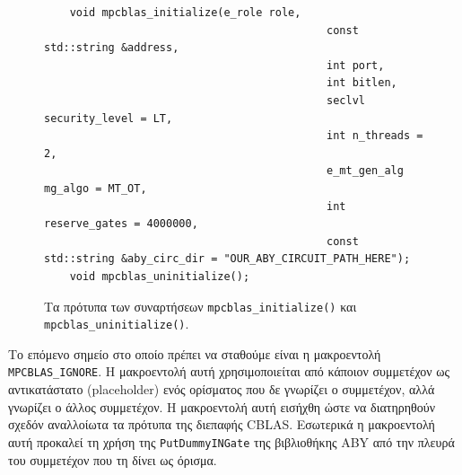 \begin{figure}[h!]
    \begin{center}
        \begin{verbatim}
    void mpcblas_initialize(e_role role,
                                            const std::string &address,
                                            int port,
                                            int bitlen,
                                            seclvl security_level = LT,
                                            int n_threads = 2,
                                            e_mt_gen_alg mg_algo = MT_OT,
                                            int reserve_gates = 4000000,
                                            const std::string &aby_circ_dir = "OUR_ABY_CIRCUIT_PATH_HERE");
    void mpcblas_uninitialize();
        \end{verbatim}
    \end{center}
    \caption{Τα πρότυπα των συναρτήσεων \texttt{mpcblas_initialize()} και \texttt{mpcblas_uninitialize()}.}
    \label{code:mpcblas-initialize-uninitialize}
\end{figure}

Το επόμενο σημείο στο οποίο πρέπει να σταθούμε είναι η μακροεντολή \texttt{MPCBLAS_IGNORE}. Η μακροεντολή αυτή χρησιμοποιείται από κάποιον συμμετέχον ως αντικατάστατο (placeholder) ενός ορίσματος που δε γνωρίζει ο συμμετέχον, αλλά γνωρίζει ο άλλος συμμετέχον. Η μακροεντολή αυτή εισήχθη ώστε να διατηρηθούν σχεδόν αναλλοίωτα τα πρότυπα της διεπαφής CBLAS. Εσωτερικά η μακροεντολή αυτή προκαλεί τη χρήση της \texttt{PutDummyINGate} της βιβλιοθήκης ABY από την πλευρά του συμμετέχον που τη δίνει ως όρισμα.

